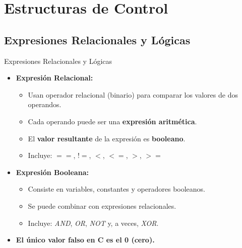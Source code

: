\documentclass{beamer}
\begin{document}


\section{Estructuras de Control}

\subsection{Expresiones Relacionales y Lógicas}
\begin{frame}[fragile]{Expresiones Relacionales y Lógicas}
\begin{itemize}
	\item \textbf{Expresión Relacional:} 
	\begin{itemize}
		\item Usan operador relacional (binario) para comparar los valores de dos operandos. 
		\item Cada operando puede ser una \textbf{expresión aritmética}.
		\item El \textbf{valor resultante} de la expresión es \textbf{booleano}.
		\item Incluye: $==$, $!=$, $<$, $<=$, $>$, $>=$
	\end{itemize}
	\item \textbf{Expresión Booleana:}  
	\begin{itemize}
		\item Consiste en variables, constantes y operadores booleanos.
		\item Se puede combinar con expresiones relacionales.
		\item Incluye: \emph{AND}, \emph{OR}, \emph{NOT} y, a veces, \emph{XOR}.
	\end{itemize}
	\item \textbf{El único valor falso en C es el 0 (cero).}
\end{itemize}
\end{frame}
\end{document}
